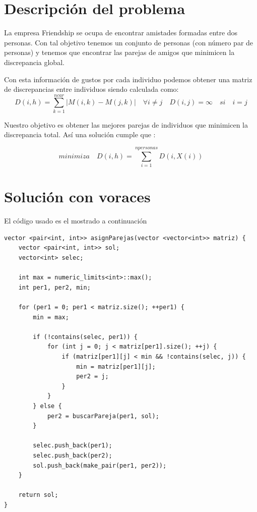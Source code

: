 \section{Descripción del problema}
La empresa Friendship se ocupa de encontrar amistades formadas entre dos personas. Con
tal objetivo tenemos un conjunto de personas (con número par de personas) y tenemos que
encontrar las parejas de amigos que minimicen la discrepancia global. 

Con esta información de gustos por cada individuo podemos obtener una matriz de
discrepancias entre individuos siendo calculada como:
\begin{equation}
    D(i,h) = \sum_{k=1}^{ncar}|M (i,k)- M (j , k )| \quad \forall i\neq j \quad D(i,j)= \infty \quad si \quad i= j
\end{equation}

Nuestro objetivo es obtener las mejores parejas de individuos que minimicen la discrepancia
total. Así una solución cumple que :


\begin{equation}
    minimiza \quad D(i,h) = \sum_{i=1}^{npersonas}D(i , X(i))
\end{equation}


\section{Solución con voraces}

El código usado es el mostrado a continuación

\begin{lstlisting}
vector <pair<int, int>> asignParejas(vector <vector<int>> matriz) {
    vector <pair<int, int>> sol;
    vector<int> selec;

    int max = numeric_limits<int>::max();
    int per1, per2, min;

    for (per1 = 0; per1 < matriz.size(); ++per1) {
        min = max;

        if (!contains(selec, per1)) {
            for (int j = 0; j < matriz[per1].size(); ++j) {
                if (matriz[per1][j] < min && !contains(selec, j)) {
                    min = matriz[per1][j];
                    per2 = j;
                }
            }
        } else {
            per2 = buscarPareja(per1, sol);
        }

        selec.push_back(per1);
        selec.push_back(per2);
        sol.push_back(make_pair(per1, per2));
    }

    return sol;
}
\end{lstlisting}

